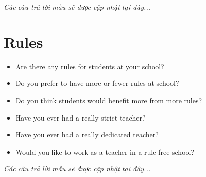 \vspace{1em}
\textit{Các câu trả lời mẫu sẽ được cập nhật tại đây...}
\vspace{2em}

\section{Rules}
\begin{ieltsprompt}
\begin{itemize}[itemsep=4pt]
    \item Are there any rules for students at your school?
    \item Do you prefer to have more or fewer rules at school?
    \item Do you think students would benefit more from more rules?
    \item Have you ever had a really strict teacher?
    \item Have you ever had a really dedicated teacher?
    \item Would you like to work as a teacher in a rule-free school?
\end{itemize}
\end{ieltsprompt}

\vspace{1em}
\textit{Các câu trả lời mẫu sẽ được cập nhật tại đây...}
\vspace{2em}

